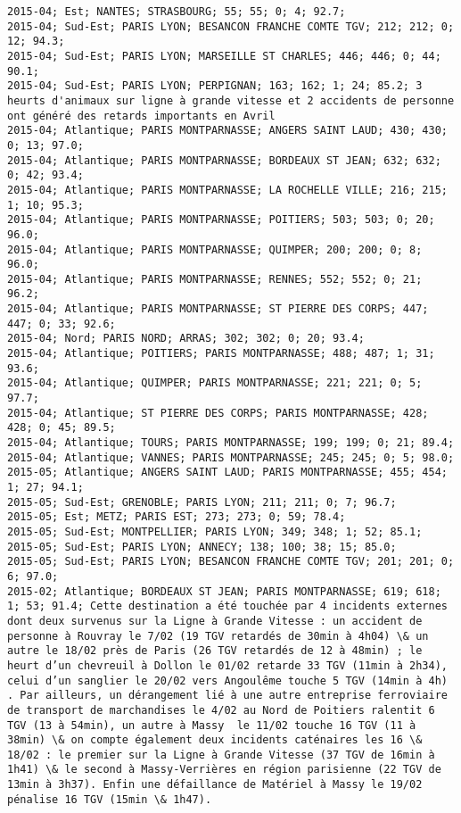 \documentclass{article}
\begin{document}
\begin{Verbatim}[commandchars=\\\{\}]
2015-04; Est; NANTES; STRASBOURG; 55; 55; 0; 4; 92.7; 
2015-04; Sud-Est; PARIS LYON; BESANCON FRANCHE COMTE TGV; 212; 212; 0; 12; 94.3; 
2015-04; Sud-Est; PARIS LYON; MARSEILLE ST CHARLES; 446; 446; 0; 44; 90.1; 
2015-04; Sud-Est; PARIS LYON; PERPIGNAN; 163; 162; 1; 24; 85.2; 3 heurts d'animaux sur ligne à grande vitesse et 2 accidents de personne ont généré des retards importants en Avril 
2015-04; Atlantique; PARIS MONTPARNASSE; ANGERS SAINT LAUD; 430; 430; 0; 13; 97.0; 
2015-04; Atlantique; PARIS MONTPARNASSE; BORDEAUX ST JEAN; 632; 632; 0; 42; 93.4; 
2015-04; Atlantique; PARIS MONTPARNASSE; LA ROCHELLE VILLE; 216; 215; 1; 10; 95.3; 
2015-04; Atlantique; PARIS MONTPARNASSE; POITIERS; 503; 503; 0; 20; 96.0; 
2015-04; Atlantique; PARIS MONTPARNASSE; QUIMPER; 200; 200; 0; 8; 96.0; 
2015-04; Atlantique; PARIS MONTPARNASSE; RENNES; 552; 552; 0; 21; 96.2; 
2015-04; Atlantique; PARIS MONTPARNASSE; ST PIERRE DES CORPS; 447; 447; 0; 33; 92.6; 
2015-04; Nord; PARIS NORD; ARRAS; 302; 302; 0; 20; 93.4; 
2015-04; Atlantique; POITIERS; PARIS MONTPARNASSE; 488; 487; 1; 31; 93.6; 
2015-04; Atlantique; QUIMPER; PARIS MONTPARNASSE; 221; 221; 0; 5; 97.7; 
2015-04; Atlantique; ST PIERRE DES CORPS; PARIS MONTPARNASSE; 428; 428; 0; 45; 89.5; 
2015-04; Atlantique; TOURS; PARIS MONTPARNASSE; 199; 199; 0; 21; 89.4; 
2015-04; Atlantique; VANNES; PARIS MONTPARNASSE; 245; 245; 0; 5; 98.0; 
2015-05; Atlantique; ANGERS SAINT LAUD; PARIS MONTPARNASSE; 455; 454; 1; 27; 94.1; 
2015-05; Sud-Est; GRENOBLE; PARIS LYON; 211; 211; 0; 7; 96.7; 
2015-05; Est; METZ; PARIS EST; 273; 273; 0; 59; 78.4; 
2015-05; Sud-Est; MONTPELLIER; PARIS LYON; 349; 348; 1; 52; 85.1; 
2015-05; Sud-Est; PARIS LYON; ANNECY; 138; 100; 38; 15; 85.0; 
2015-05; Sud-Est; PARIS LYON; BESANCON FRANCHE COMTE TGV; 201; 201; 0; 6; 97.0; 
2015-02; Atlantique; BORDEAUX ST JEAN; PARIS MONTPARNASSE; 619; 618; 1; 53; 91.4; Cette destination a été touchée par 4 incidents externes dont deux survenus sur la Ligne à Grande Vitesse : un accident de personne à Rouvray le 7/02 (19 TGV retardés de 30min à 4h04) \& un autre le 18/02 près de Paris (26 TGV retardés de 12 à 48min) ; le heurt d’un chevreuil à Dollon le 01/02 retarde 33 TGV (11min à 2h34), celui d’un sanglier le 20/02 vers Angoulême touche 5 TGV (14min à 4h) . Par ailleurs, un dérangement lié à une autre entreprise ferroviaire de transport de marchandises le 4/02 au Nord de Poitiers ralentit 6 TGV (13 à 54min), un autre à Massy  le 11/02 touche 16 TGV (11 à 38min) \& on compte également deux incidents caténaires les 16 \& 18/02 : le premier sur la Ligne à Grande Vitesse (37 TGV de 16min à 1h41) \& le second à Massy-Verrières en région parisienne (22 TGV de 13min à 3h37). Enfin une défaillance de Matériel à Massy le 19/02 pénalise 16 TGV (15min \& 1h47).

\end{Verbatim}
\end{document}
